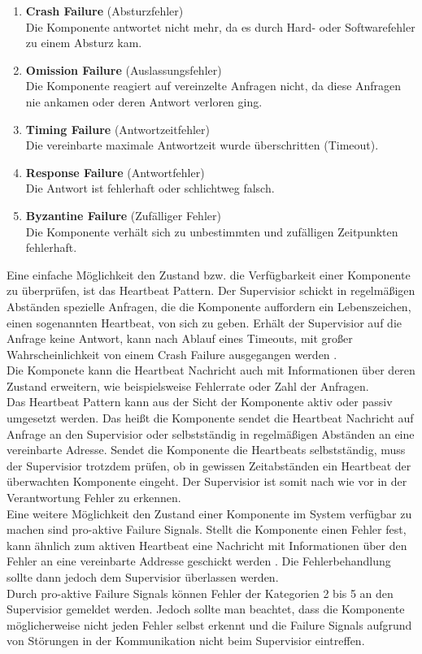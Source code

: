 \begin{enumerate}
\item \textbf{Crash Failure} (Absturzfehler)\\
Die Komponente antwortet nicht mehr, da es durch Hard- oder Softwarefehler zu einem Absturz kam.
\item \textbf{Omission Failure} (Auslassungsfehler)\\
Die Komponente reagiert auf vereinzelte Anfragen nicht, da diese Anfragen nie ankamen oder deren Antwort verloren ging.
\item \textbf{Timing Failure} (Antwortzeitfehler)\\
Die vereinbarte maximale Antwortzeit wurde überschritten (Timeout).
\item \textbf{Response Failure} (Antwortfehler)\\
Die Antwort ist fehlerhaft oder schlichtweg falsch.
\item \textbf{Byzantine Failure} (Zufälliger Fehler)\\
Die Komponente verhält sich zu unbestimmten und zufälligen Zeitpunkten fehlerhaft.
\end{enumerate}

Eine einfache Möglichkeit den Zustand bzw. die Verfügbarkeit einer Komponente zu überprüfen, ist das Heartbeat Pattern. Der Supervisior schickt in regelmäßigen Abständen spezielle Anfragen, die die Komponente auffordern ein Lebenszeichen, einen sogenannten Heartbeat, von sich zu geben. Erhält der Supervisior auf die Anfrage keine Antwort, kann nach Ablauf eines Timeouts, mit großer Wahrscheinlichkeit von einem Crash Failure ausgegangen werden \cite[S.~200~\&~S.~201]{kuhn_reactive_2015}.\\
Die Komponete kann die Heartbeat Nachricht auch mit Informationen über deren Zustand erweitern, wie beispielsweise Fehlerrate oder Zahl der Anfragen.\\
Das Heartbeat Pattern kann aus der Sicht der Komponente aktiv oder passiv umgesetzt werden. Das heißt die Komponente sendet die Heartbeat Nachricht auf Anfrage an den Supervisior oder selbstständig in regelmäßigen Abständen an eine vereinbarte Adresse. Sendet die Komponente die Heartbeats selbstständig, muss der Supervisior trotzdem prüfen, ob in gewissen Zeitabständen ein Heartbeat der überwachten Komponente eingeht. Der Supervisior ist somit nach wie vor in der Verantwortung Fehler zu erkennen.\\

Eine weitere Möglichkeit den Zustand einer Komponente im System verfügbar zu machen sind pro-aktive Failure Signals. Stellt die Komponente einen Fehler fest, kann ähnlich zum aktiven Heartbeat eine Nachricht mit Informationen über den Fehler an eine vereinbarte Addresse geschickt werden \cite[S.~201~\&~S.202]{kuhn_reactive_2015}. Die Fehlerbehandlung sollte dann jedoch dem Supervisior überlassen werden.\\
Durch pro-aktive Failure Signals können Fehler der Kategorien 2 bis 5 an den Supervisior gemeldet werden. Jedoch sollte man beachtet, dass die Komponente möglicherweise nicht jeden Fehler selbst erkennt und die Failure Signals aufgrund von Störungen in der Kommunikation nicht beim Supervisior eintreffen.\\

